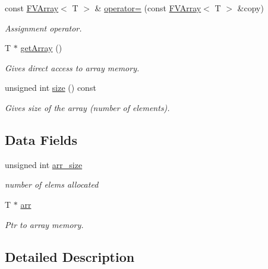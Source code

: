 \begin{DoxyCompactItemize}
const \hyperlink{classFVL_1_1FVArray}{FVArray}$<$ T $>$ \& \hyperlink{classFVL_1_1FVArray_a800962abf6eb71a43d99c156793fd5c5}{operator=} (const \hyperlink{classFVL_1_1FVArray}{FVArray}$<$ T $>$ \&copy)
\begin{DoxyCompactList}\small\item\em Assignment operator. \item\end{DoxyCompactList}\item 
T $\ast$ \hyperlink{classFVL_1_1FVArray_ad57caa1a97910998e7b9453ccbb3831c}{getArray} ()
\begin{DoxyCompactList}\small\item\em Gives direct access to array memory. \item\end{DoxyCompactList}\item 
unsigned int \hyperlink{classFVL_1_1FVArray_a90ca964ebcc1b02bbcde225edd49e812}{size} () const 
\begin{DoxyCompactList}\small\item\em Gives size of the array (number of elements). \item\end{DoxyCompactList}\end{DoxyCompactItemize}
\subsection*{Data Fields}
\begin{DoxyCompactItemize}
\item 
unsigned int \hyperlink{classFVL_1_1FVArray_a34a728cbcdbff333ec99c822697e3679}{arr\_\-size}
\begin{DoxyCompactList}\small\item\em number of elems allocated \item\end{DoxyCompactList}\item 
T $\ast$ \hyperlink{classFVL_1_1FVArray_a146e9e7358f9c0ad7b78c73519623f6c}{arr}
\begin{DoxyCompactList}\small\item\em Ptr to array memory. \item\end{DoxyCompactList}\end{DoxyCompactItemize}


\subsection{Detailed Description}
